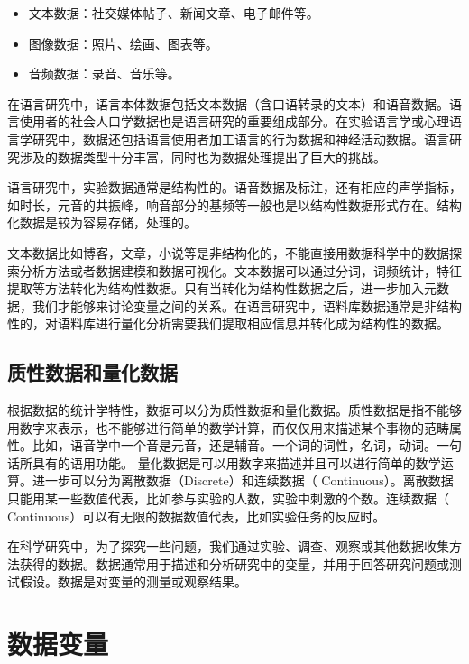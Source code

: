 \documentclass[]{book}
\providecommand{\tightlist}{%
  \setlength{\itemsep}{0pt}\setlength{\parskip}{0pt}}
\begin{document}
\begin{itemize}
\tightlist
\item
  文本数据：社交媒体帖子、新闻文章、电子邮件等。
\item
  图像数据：照片、绘画、图表等。
\item
  音频数据：录音、音乐等。
\end{itemize}

在语言研究中，语言本体数据包括文本数据（含口语转录的文本）和语音数据。语言使用者的社会人口学数据也是语言研究的重要组成部分。在实验语言学或心理语言学研究中，数据还包括语言使用者加工语言的行为数据和神经活动数据。语言研究涉及的数据类型十分丰富，同时也为数据处理提出了巨大的挑战。

语言研究中，实验数据通常是结构性的。语音数据及标注，还有相应的声学指标，如时长，元音的共振峰，响音部分的基频等一般也是以结构性数据形式存在。结构化数据是较为容易存储，处理的。

文本数据比如博客，文章，小说等是非结构化的，不能直接用数据科学中的数据探索分析方法或者数据建模和数据可视化。文本数据可以通过分词，词频统计，特征提取等方法转化为结构性数据。只有当转化为结构性数据之后，进一步加入元数据，我们才能够来讨论变量之间的关系。在语言研究中，语料库数据通常是非结构性的，对语料库进行量化分析需要我们提取相应信息并转化成为结构性的数据。

\hypertarget{ux8d28ux6027ux6570ux636eux548cux91cfux5316ux6570ux636e}{%
\subsection{质性数据和量化数据}\label{ux8d28ux6027ux6570ux636eux548cux91cfux5316ux6570ux636e}}

根据数据的统计学特性，数据可以分为质性数据和量化数据。质性数据是指不能够用数字来表示，也不能够进行简单的数学计算，而仅仅用来描述某个事物的范畴属性。比如，语音学中一个音是元音，还是辅音。一个词的词性，名词，动词。一句话所具有的语用功能。
量化数据是可以用数字来描述并且可以进行简单的数学运算。进一步可以分为离散数据（Discrete）和连续数据（ Continuous）。离散数据只能用某一些数值代表，比如参与实验的人数，实验中刺激的个数。连续数据（ Continuous）可以有无限的数据数值代表，比如实验任务的反应时。

在科学研究中，为了探究一些问题，我们通过实验、调查、观察或其他数据收集方法获得的数据。数据通常用于描述和分析研究中的变量，并用于回答研究问题或测试假设。数据是对变量的测量或观察结果。

\hypertarget{ux6570ux636eux53d8ux91cf}{%
\section{数据变量}\label{ux6570ux636eux53d8ux91cf}}
\end{document}
